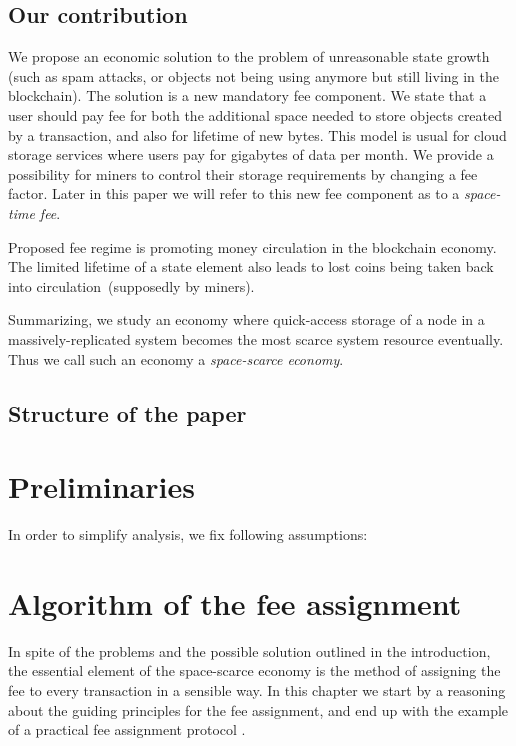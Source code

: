 \documentclass[]{llncs}   %
\newcommand{\authnote}[2]{\marginpar{\parbox{\marginparwidth}{\tiny %
  \textsf{#1 {\textcolor{blue}{notes: #2}}}}}%
  \textcolor{blue}{\textbf{\dag}}}
\newcommand{\authnote}[2]{
  \textsf{#1\textcolor{blue}{ #2}}}
\newcommand{\authnote}[2]{}
\newcommand{\knote}[1]{{\authnote{\textcolor{green}{Alex notes:}}{#1}}}
\newcommand{\vk}[1]{{\authnote{\textcolor{red}{V:}}{#1}}}
\begin{document}
\subsection{Our contribution}

We propose an economic solution to the problem of unreasonable state growth
(such as spam attacks, or objects not being using anymore but still living in
the blockchain). The solution is a new mandatory fee component. We state that a
user should pay fee for both the additional space needed to store objects
created by a transaction, and also for lifetime of new bytes. This model is
usual for cloud storage services where users pay for gigabytes of data per
month. We provide a possibility for miners to control their storage requirements
by changing a fee factor. Later in this paper we will refer to this new fee
component as to a {\em space-time fee}.

\knote{write abt fee adjustment rule}

Proposed fee regime is promoting money circulation in the blockchain economy.
The limited lifetime of a state element also leads to lost coins being taken
back into circulation~(supposedly by miners). 

Summarizing, we study an economy where quick-access storage of a node in a
massively-replicated system becomes the most scarce system resource eventually.
Thus we call such an economy a {\em space-scarce economy}.

\subsection{Structure of the paper}

\knote{todo: write}

\section{Preliminaries}

In order to simplify analysis, we fix following assumptions: 



\section{Algorithm of the fee assignment}
In spite of the problems and the possible solution outlined in the introduction,
the essential element of the space-scarce economy is the method of assigning the
fee to every transaction \vk{or block?} in a sensible way. In this chapter we
start by a reasoning about the guiding principles for the fee assignment, and
end up with the example of a practical fee assignment protocol \knote{rule?}.
\end{document}
